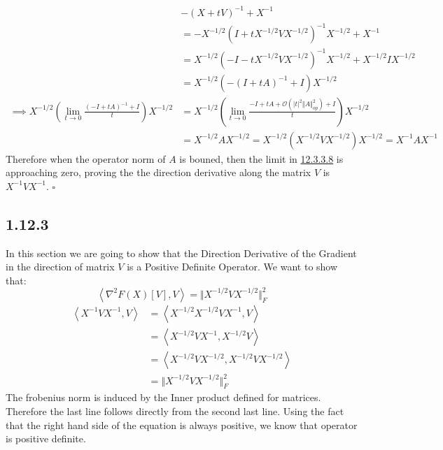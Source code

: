 \documentclass[]{article}
\begin{document}
        \begin{align*}\tag{12.3.3.10}\label{eqn:12.3.3.10}
            & -(X + tV)^{-1} + X^{-1}
            \\
            &= -X^{-1/2}(I + tX^{-1/2}VX^{-1/2})^{-1} X^{-1/2} + X^{-1} 
            \\
            &= X^{-1/2}(-I - tX^{-1/2}VX^{-1/2})^{-1} X^{-1/2} + X^{-1/2} I X^{-1/2}
            \\
            &= X^{-1/2}(-(I + tA)^{-1} + I)X^{-1/2}
            \\
            \implies X^{-1/2}\left(
                \lim_{t\rightarrow 0} \frac{(-I + tA)^{-1} + I}{t}
            \right)X^{-1/2}
            &= 
            X^{-1/2}\left(\lim_{t\rightarrow 0} 
                \frac{-I + tA + \mathcal{O}(|t|^2\Vert A\Vert_{op}^2) + I}{t}
            \right)X^{-1/2}
            \\
            &= X^{-1/2}AX^{-1/2} = X^{-1/2}(X^{-1/2}VX^{-1/2})X^{-1/2} = X^{-1}AX^{-1}
        \end{align*}
        Therefore when the operator norm of $A$ is bouned, then the limit in \hyperref[eqn:12.3.3.8]{12.3.3.8} is approaching zero, proving the the direction derivative along the matrix $V$ is $X^{-1}VX^{-1}$. $\square$
        \\[1.1em]
    \subsection*{1.12.3}
        In this section we are going to show that the Direction Derivative of the Gradient in the direction of matrix $V$ is a Positive Definite Operator. We want to show that: 
        $$
            \left\langle 
                \nabla^2F(X)[V], V
            \right\rangle
            = 
            \Vert X^{-1/2}VX^{-1/2}\Vert_F^2
        $$
        \begin{align*}\tag{1.12.3.1}\label{eqn:1.12.3.1}
            \left\langle X^{-1}VX^{-1}, V \right\rangle
            &= \left\langle X^{-1/2}X^{-1/2}VX^{-1}, V \right\rangle
            \\
            &= 
            \left\langle X^{-1/2}VX^{-1}, X^{-1/2}V \right\rangle
            \\
            &= 
            \left\langle X^{-1/2}VX^{-1/2}, X^{-1/2}VX^{-1/2} \right\rangle
            \\
            &= \Vert X^{-1/2}VX^{-1/2}\Vert_F^2
        \end{align*}
        The frobenius norm is induced by the Inner product defined for matrices. Therefore the last line follows directly from the second last line. Using the fact that the right hand side of the equation is always positive, we know that operator is positive definite. 
\end{document}
